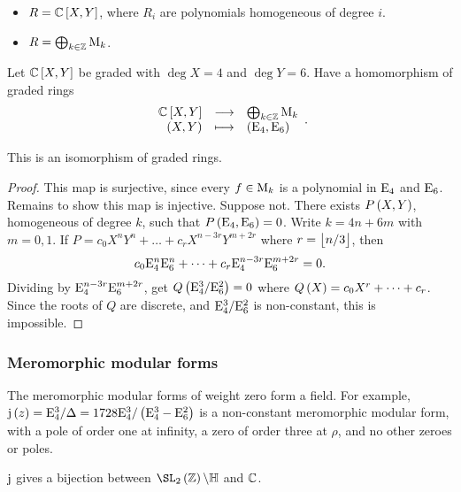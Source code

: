 \begin{example*}
\hfill
\begin{itemize}
\item $ R = \CC\sbr{X, Y} $, where $ R_i $ are polynomials homogeneous of degree $ i $.
\item $ R = \bigoplus_{k \in \mathbb{Z}} \mathrm{M}_k $.
\end{itemize}
\end{example*}

\pagebreak

Let $ \CC\sbr{X, Y} $ be graded with $ \deg X = 4 $ and $ \deg Y = 6 $. Have a homomorphism of graded rings
$$ \function{\CC\sbr{X, Y}}{\bigoplus_{k \in \ZZ} \M_k}{\br{X, Y}}{\br{\E_4, \E_6}}. $$

\begin{theorem}
This is an isomorphism of graded rings.
\end{theorem}

\begin{proof}
This map is surjective, since every $ f \in \mathrm{M}_k $ is a polynomial in $ \mathrm{E}_4 $ and $ \mathrm{E}_6 $. Remains to show this map is injective. Suppose not. There exists $ P\br{X, Y} $, homogeneous of degree $ k $, such that $ P\br{\E_4, \E_6} = 0 $. Write $ k = 4n + 6m $ with $ m = 0, 1 $. If $ P = c_0X^nY^n + \dots + c_rX^{n - 3r}Y^{m + 2r} $ where $ r = \left\lfloor n / 3 \right\rfloor $, then
$$ c_0\mathrm{E}_4^n\mathrm{E}_6^n + \dots + c_r\mathrm{E}_4^{n - 3r}\mathrm{E}_6^{m + 2r} = 0. $$
Dividing by $ \mathrm{E}_4^{n - 3r}\mathrm{E}_6^{m + 2r} $, get $ Q\br{\E_4^3 / \E_6^2} = 0 $ where $ Q\br{X} = c_0X^r + \dots + c_r $. Since the roots of $ Q $ are discrete, and $ \mathrm{E}_4^3 / \mathrm{E}_6^2 $ is non-constant, this is impossible.
\end{proof}

\subsubsection{Meromorphic modular forms}

\begin{note*}
The meromorphic modular forms of weight zero form a field. For example, $ \j\br{z} = \E_4^3 / \Delta = 1728\E_4^3 / \br{\E_4^3 - \E_6^2} $ is a non-constant meromorphic modular form, with a pole of order one at infinity, a zero of order three at $ \rho $, and no other zeroes or poles.
\end{note*}

\begin{theorem}
$ \mathrm{j} $ gives a bijection between $ \SL_2\br{\ZZ} \backslash \HH $ and $ \mathbb{C} $.
\end{theorem}

